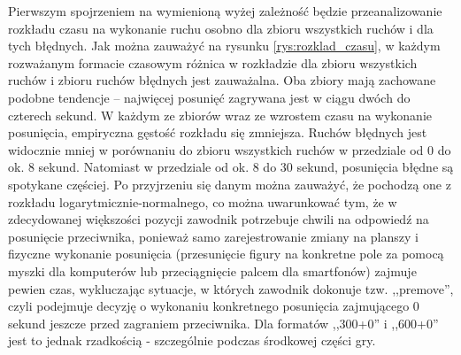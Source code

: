 \documentclass[inzynierska]{pwr_wmat_praca_dyplomowa}
\theoremstyle{plain}
\numberwithin{theorem}{chapter}
\theoremstyle{definition}
\numberwithin{theorem}{chapter}
\begin{document}
Pierwszym spojrzeniem na wymienioną wyżej zależność będzie przeanalizowanie rozkładu czasu na wykonanie ruchu osobno dla zbioru wszystkich ruchów i dla tych błędnych. Jak można zauważyć na rysunku \ref{rys:rozklad_czasu}, w każdym rozważanym formacie czasowym różnica w rozkładzie dla zbioru wszystkich ruchów i zbioru ruchów błędnych jest zauważalna. Oba zbiory mają zachowane podobne tendencje -- najwięcej posunięć zagrywana jest w ciągu dwóch do czterech sekund. W każdym ze zbiorów wraz ze wzrostem czasu na wykonanie posunięcia, empiryczna gęstość rozkładu się zmniejsza. Ruchów błędnych jest widocznie mniej w porównaniu do zbioru wszystkich ruchów w przedziale od 0 do ok. 8 sekund. Natomiast w przedziale od ok. 8 do 30 sekund, posunięcia błędne są spotykane częściej.
Po przyjrzeniu się danym można zauważyć, że pochodzą one z rozkładu logarytmicznie-normalnego, co można uwarunkować tym, że w zdecydowanej większości pozycji zawodnik potrzebuje chwili na odpowiedź na posunięcie przeciwnika, ponieważ samo zarejestrowanie zmiany na planszy i fizyczne wykonanie posunięcia (przesunięcie figury na konkretne pole za pomocą myszki dla komputerów lub przeciągnięcie palcem dla smartfonów) zajmuje pewien czas, wykluczając sytuacje, w których zawodnik dokonuje tzw. ,,premove'', czyli podejmuje decyzję o wykonaniu konkretnego posunięcia zajmującego 0 sekund jeszcze przed zagraniem przeciwnika. Dla formatów ,,300+0'' i ,,600+0'' jest to jednak rzadkością - szczególnie podczas środkowej części gry.
\end{document}
